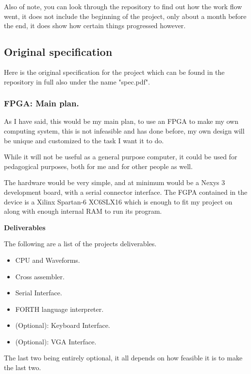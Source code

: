 \documentclass	[a4paper, 10pt]	{article}
\begin{document}
  Also of note, you can look through the repository to find out how the work flow went, it
  does not include the beginning of the project, only about a month before the end, it does
  show how certain things progressed however.

  

  \subsection{Original specification}

      Here is the original specification for the project which can be found in the repository
  in full also under the name "spec.pdf".

      \subsubsection{FPGA: Main plan.}

      As I have said, this would be my main plan, to use an FPGA to make my own
      computing system, this is not infeasible and has done before, my own design
      will be unique and customized to the task I want it to do.

          While it will not be useful as a general purpose computer, it could be used
      for pedagogical purposes, both for me and for other people as well.

          The hardware would be very simple, and at minimum would be a Nexys 3
      development board, with a serial connector interface. The FGPA contained in
      the device is a Xilinx Spartan-6 XC6SLX16 which is enough to fit my project
      on along with enough internal RAM to run its program.

      \noindent \textbf{Deliverables}

      The following are a list of the projects deliverables.

        \begin{itemize}
        \item CPU and Waveforms.
        \item Cross assembler.
        \item Serial Interface.
        \item FORTH language interpreter.
        \item (Optional): Keyboard Interface.
        \item (Optional): VGA Interface.
      \end{itemize}
      The last two being entirely optional, it all depends on how feasible it is to make
      the last two.
\end{document}
